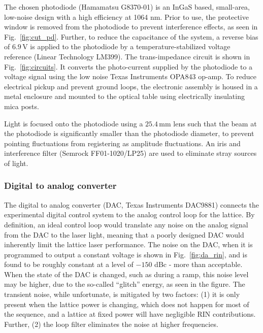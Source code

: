 \documentclass[twocolumn,aps,pra,showpacs,preprintnumbers,bibnotes]{revtex4-1}
\begin{document}
The chosen photodiode (Hamamatsu G8370-01) is an InGaS based, small-area, low-noise design with a high efficiency at 1064 nm.
Prior to use, the protective window is removed from the photodiode to prevent interference effects, as seen in Fig.~\ref{fig:cut_pd}.
Further, to reduce the capacitance of the system, a reverse bias of $6.9\,$V is applied to the photodiode by a temperature-stabilized voltage reference (Linear Technology LM399).
The trans-impedance circuit is shown in Fig.~\ref{fig:circuits}.
It converts the photo-current supplied by the photodiode to a voltage signal using the low noise Texas Instruments OPA843 op-amp.
To reduce electrical pickup and prevent ground loops, the electronic assembly is housed in a metal enclosure and mounted to the optical table using electrically insulating mica posts.

Light is focused onto the photodiode using a $25.4\,$mm lens such that the beam at the photodiode is significantly smaller than the photodiode diameter, to prevent pointing fluctuations from registering as amplitude fluctuations.
An iris and interference filter (Semrock FF01-1020/LP25) are used to eliminate stray sources of light.


\subsubsection{Digital to analog converter}
The digital to analog converter (DAC, Texas Instruments DAC9881) connects the experimental digital control system to the analog control loop for the lattice.
By definition, an ideal control loop would translate any noise on the analog signal from the DAC to the laser light, meaning that a poorly designed DAC would inherently limit the lattice laser performance.
The noise on the DAC, when it is programmed to output a constant voltage is shown in Fig.~\ref{fig:da_rin}, and is found to be roughly constant at a level of $-150$ dBc - more than acceptable.
When the state of the DAC is changed, such as during a ramp, this noise level may be higher, due to the so-called ``glitch'' energy, as seen in the figure.
The transient noise, while unfortunate, is mitigated by two factors: (1) it is only present when the lattice power is changing, which does not happen for most of the sequence, and a lattice at fixed power will have negligible RIN contributions. Further, (2) the loop filter eliminates the noise at higher frequencies.
\end{document}
